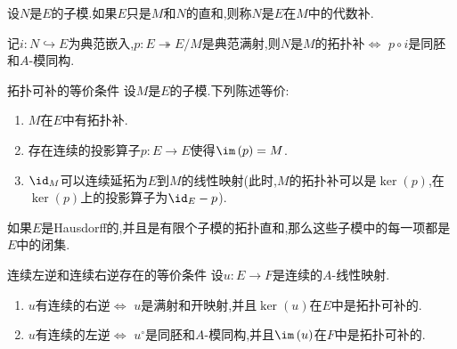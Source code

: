 \begin{remark}{}{}
	设$N$是$E$的子模.如果$E$只是$M$和$N$的直和,则称$N$是$E$在$M$中的代数补.
\end{remark}

\begin{remark}{}{}
	记$i:N\hookrightarrow E$为典范嵌入,$p:E\twoheadrightarrow E/M$是典范满射,则$N$是$M$的拓扑补$\iff$ $p\circ i$是同胚和$A$-模同构.
\end{remark}

\begin{proposition}{拓扑可补的等价条件}{}
	设$M$是$E$的子模.下列陈述等价:
	\begin{enumerate}
		\item $M$在$E$中有拓扑补.
		\item 存在连续的投影算子$p:E\to E$使得$\im\left(p\right)=M$.
		\item $\id_{M}$可以连续延拓为$E$到$M$的线性映射(此时,$M$的拓扑补可以是$\ker\left(p\right)$,在$\ker\left(p\right)$上的投影算子为$\id_{E}-p$).
	\end{enumerate}
\end{proposition}

\begin{remark}{}{}
	如果$E$是Hausdorff的,并且是有限个子模的拓扑直和,那么这些子模中的每一项都是$E$中的闭集.
\end{remark}

\begin{proposition}{连续左逆和连续右逆存在的等价条件}{}
	设$u:E\to F$是连续的$A$-线性映射.
	\begin{enumerate}
		\item $u$有连续的右逆$\iff$ $u$是满射和开映射,并且$\ker\left(u\right)$在$E$中是拓扑可补的.
		\item $u$有连续的左逆$\iff$ $u^{\circ}$是同胚和$A$-模同构,并且$\im\left(u\right)$在$F$中是拓扑可补的.
	\end{enumerate}
\end{proposition}
